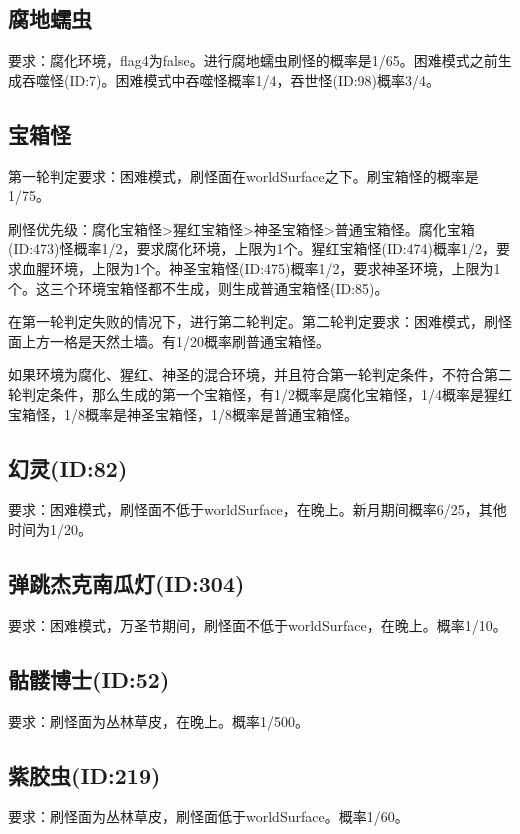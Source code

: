 \subsection{腐地蠕虫}
要求：腐化环境，flag4为false。进行腐地蠕虫刷怪的概率是1/65。困难模式之前生成吞噬怪(ID:7)。困难模式中吞噬怪概率1/4，吞世怪(ID:98)概率3/4。

\subsection{宝箱怪}
第一轮判定要求：困难模式，刷怪面在worldSurface之下。刷宝箱怪的概率是1/75。

刷怪优先级：腐化宝箱怪>猩红宝箱怪>神圣宝箱怪>普通宝箱怪。腐化宝箱(ID:473)怪概率1/2，要求腐化环境，上限为1个。猩红宝箱怪(ID:474)概率1/2，要求血腥环境，上限为1个。神圣宝箱怪(ID:475)概率1/2，要求神圣环境，上限为1个。这三个环境宝箱怪都不生成，则生成普通宝箱怪(ID:85)。

在第一轮判定失败的情况下，进行第二轮判定。第二轮判定要求：困难模式，刷怪面上方一格是天然土墙。有1/20概率刷普通宝箱怪。

\begin{remark}
如果环境为腐化、猩红、神圣的混合环境，并且符合第一轮判定条件，不符合第二轮判定条件，那么生成的第一个宝箱怪，有1/2概率是腐化宝箱怪，1/4概率是猩红宝箱怪，1/8概率是神圣宝箱怪，1/8概率是普通宝箱怪。
\end{remark}

\subsection{幻灵(ID:82)}
要求：困难模式，刷怪面不低于worldSurface，在晚上。新月期间概率6/25，其他时间为1/20。

\subsection{弹跳杰克南瓜灯(ID:304)}
要求：困难模式，万圣节期间，刷怪面不低于worldSurface，在晚上。概率1/10。

\subsection{骷髅博士(ID:52)}
要求：刷怪面为丛林草皮，在晚上。概率1/500。

\subsection{紫胶虫(ID:219)}
要求：刷怪面为丛林草皮，刷怪面低于worldSurface。概率1/60。

